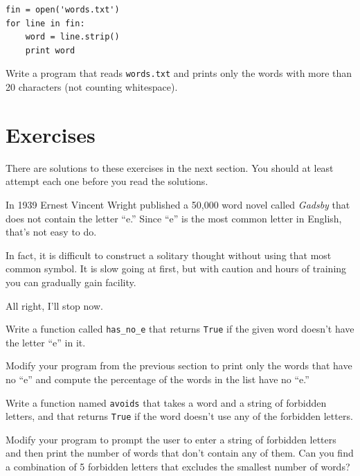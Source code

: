 \documentclass[10pt]{book}
\begin{document}

\beforeverb
\begin{verbatim}
fin = open('words.txt')
for line in fin:
    word = line.strip()
    print word
\end{verbatim}
\afterverb
%

\begin{ex}
Write a program that reads {\tt words.txt} and prints only the
words with more than 20 characters (not counting whitespace).


\end{ex}


\section{Exercises}

There are solutions to these exercises in the next section.
You should at least attempt each one before you read the solutions.

\begin{ex}
In 1939 Ernest Vincent Wright published a 50,000 word novel called
{\em Gadsby} that does not contain the letter ``e.''  Since ``e'' is
the most common letter in English, that's not easy to do.

In fact, it is difficult to construct a solitary thought without using
that most common symbol.  It is slow going at first, but with caution
and hours of training you can gradually gain facility.

All right, I'll stop now.

Write a function called \verb"has_no_e" that returns {\tt True} if
the given word doesn't have the letter ``e'' in it.

Modify your program from the previous section to print only the words
that have no ``e'' and compute the percentage of the words in the list
have no ``e.''


\end{ex}


\begin{ex} 
Write a function named {\tt avoids}
that takes a word and a string of forbidden letters, and
that returns {\tt True} if the word doesn't use any of the forbidden
letters.

Modify your program to prompt the user to enter a string
of forbidden letters and then print the number of words that
don't contain any of them.
Can you find a combination of 5 forbidden letters that
excludes the smallest number of words?
\end{ex}
\end{document}
